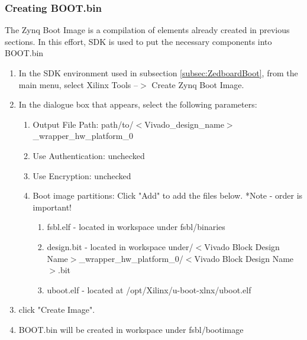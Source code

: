 \subsubsection{Creating BOOT.bin}
The Zynq Boot Image is a compilation of elements already created in previous sections.  In this effort, SDK is used to put the necessary components into BOOT.bin
\begin{enumerate}
\item In the SDK environment used in subsection \ref{subsec:ZedboardBoot}, from the main menu, select Xilinx Tools --$>$ Create Zynq Boot Image.
\item In the dialogue box that appears, select the following parameters:
\begin{enumerate}
\item Output File Path: path/to/$<$Vivado\_design\_name$>$\_wrapper\_hw\_platform\_0
\item Use Authentication: unchecked
\item Use Encryption: unchecked
\item Boot image partitions: Click "Add" to add the files below. *Note - order is important!
\begin{enumerate}
\item fsbl.elf - located in workspace under fsbl/binaries
\item design.bit - located in workspace under/$<$Vivado Block Design Name$>$\_wrapper\_hw\_platform\_0/$<$Vivado Block Design Name$>$.bit
\item uboot.elf - located at /opt/Xilinx/u-boot-xlnx/uboot.elf
\end{enumerate}
\end{enumerate}
\item click "Create Image".
\item BOOT.bin will be created in workspace under fsbl/bootimage
\end{enumerate}
